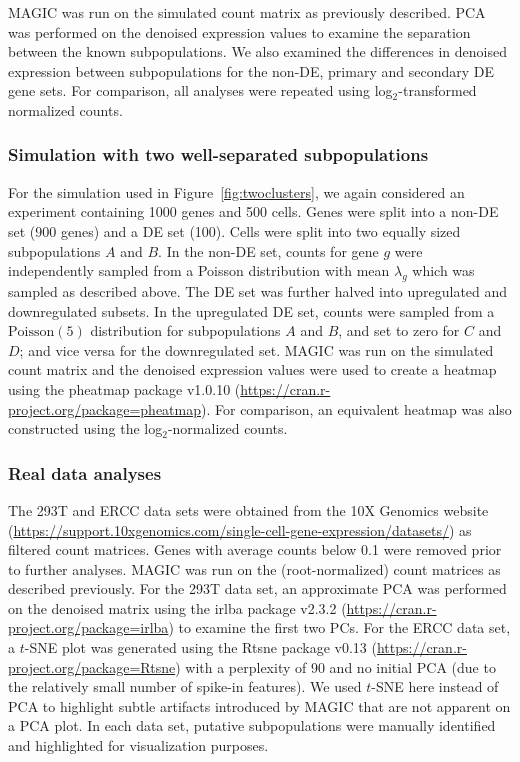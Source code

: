 \documentclass[10pt,letterpaper]{article}
\begin{document}
MAGIC was run on the simulated count matrix as previously described.
PCA was performed on the denoised expression values to examine the separation between the known subpopulations.
We also examined the differences in denoised expression between subpopulations for the non-DE, primary and secondary DE gene sets.
For comparison, all analyses were repeated using log$_2$-transformed normalized counts.

\subsubsection*{Simulation with two well-separated subpopulations}
For the simulation used in Figure~\ref{fig:twoclusters}, we again considered an experiment containing 1000 genes and 500 cells.
Genes were split into a non-DE set (900 genes) and a DE set (100).
Cells were split into two equally sized subpopulations $A$ and $B$.
In the non-DE set, counts for gene $g$ were independently sampled from a Poisson distribution with mean $\lambda_{g}$ which was sampled as described above.
The DE set was further halved into upregulated and downregulated subsets.
In the upregulated DE set, counts were sampled from a $\mbox{Poisson}(5)$ distribution for subpopulations $A$ and $B$, and set to zero for $C$ and $D$;
and vice versa for the downregulated set.
MAGIC was run on the simulated count matrix and the denoised expression values were used to create a heatmap using the pheatmap package v1.0.10 (\url{https://cran.r-project.org/package=pheatmap}).
For comparison, an equivalent heatmap was also constructed using the log$_2$-normalized counts.

\subsubsection*{Real data analyses}
The 293T and ERCC data sets were obtained from the 10X Genomics website (\url{https://support.10xgenomics.com/single-cell-gene-expression/datasets/}) as filtered count matrices.
Genes with average counts below 0.1 were removed prior to further analyses.
MAGIC was run on the (root-normalized) count matrices as described previously.
For the 293T data set, an approximate PCA was performed on the denoised matrix using the irlba package v2.3.2 (\url{https://cran.r-project.org/package=irlba}) to examine the first two PCs.
For the ERCC data set, a $t$-SNE plot was generated using the Rtsne package v0.13 (\url{https://cran.r-project.org/package=Rtsne}) with a perplexity of 90 and no initial PCA
(due to the relatively small number of spike-in features).
We used $t$-SNE here instead of PCA to highlight subtle artifacts introduced by MAGIC that are not apparent on a PCA plot.
In each data set, putative subpopulations were manually identified and highlighted for visualization purposes.



\end{document}
